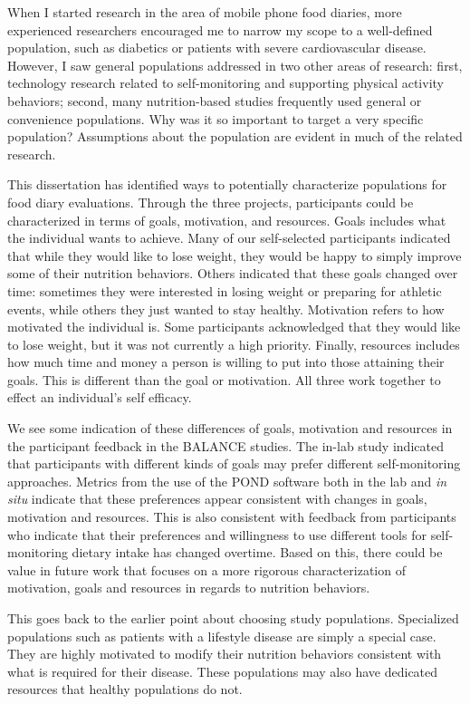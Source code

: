 When I started research in the area of mobile phone food diaries, more experienced researchers encouraged me to narrow my scope to a well-defined population, such as diabetics or patients with severe cardiovascular disease. However, I saw general populations addressed in two other areas of research: first, technology research related to self-monitoring and supporting physical activity behaviors; second, many nutrition-based studies frequently used general or convenience populations. Why was it so important to target a very specific population? Assumptions about the population are evident in much of the related research. 

This dissertation has identified ways to potentially characterize populations for food diary evaluations. Through the three projects, participants could be characterized in terms of goals, motivation, and resources. Goals includes what the individual wants to achieve. Many of our self-selected participants indicated that while they would like to lose weight, they would be happy to simply improve some of their nutrition behaviors. Others indicated that these goals changed over time: sometimes they were interested in losing weight or preparing for athletic events, while others they just wanted to stay healthy.   Motivation refers to how motivated the individual is. Some participants acknowledged that they would like to lose weight, but it was not currently a high priority. Finally, resources includes how much time and money a person is willing to put into those attaining their goals. This is different than the goal or motivation. All three work together to effect an individual's self efficacy. 

We see some indication of these differences of goals, motivation and resources in the participant feedback in the BALANCE studies. The in-lab study indicated that participants with different kinds of goals may prefer different self-monitoring approaches. Metrics from the use of the POND software both in the lab and \textit{in situ} indicate that these preferences appear consistent with changes in goals, motivation and resources. This is also consistent with feedback from participants who indicate that their preferences and willingness to use different tools for self-monitoring dietary intake has changed overtime. Based on this, there could be value in future work that focuses on a more rigorous characterization of motivation, goals and resources in regards to nutrition behaviors. 

This goes back to the earlier point about choosing study populations. Specialized populations such as patients with a lifestyle disease are simply a special case. They are highly motivated to modify their nutrition behaviors consistent with what is required for their disease. These populations may also have dedicated resources that healthy populations do not. 

